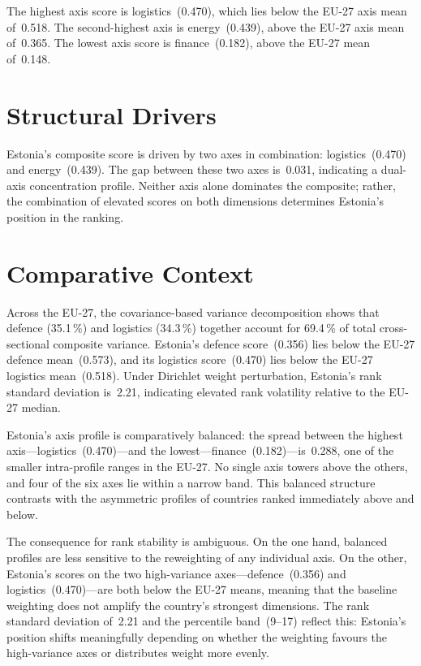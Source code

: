 \documentclass[12pt,a4paper]{article}
\begin{document}
The highest axis score is logistics~(0.470), which lies below the EU-27 axis mean of~0.518.  The second-highest axis is energy~(0.439), above the EU-27 axis mean of~0.365.  The lowest axis score is finance~(0.182), above the EU-27 mean of~0.148.


\section{Structural Drivers}
\label{sec:drivers}

\begin{sloppypar}
Estonia's composite score is driven by two axes in combination: logistics~(0.470) and energy~(0.439).  The gap between these two axes is~0.031, indicating a dual-axis concentration profile.  Neither axis alone dominates the composite; rather, the combination of elevated scores on both dimensions determines Estonia's position in the ranking.
\end{sloppypar}


\section{Comparative Context}
\label{sec:comparative}

Across the EU-27, the covariance-based variance decomposition shows that defence (35.1\,\%) and logistics (34.3\,\%) together account for 69.4\,\% of total cross-sectional composite variance.  Estonia's defence score~(0.356) lies below the EU-27 defence mean~(0.573), and its logistics score~(0.470) lies below the EU-27 logistics mean~(0.518).  Under Dirichlet weight perturbation, Estonia's rank standard deviation is~2.21, indicating elevated rank volatility relative to the EU-27 median.



\begin{sloppypar}
Estonia's axis profile is comparatively balanced: the spread between the highest axis---logistics~(0.470)---and the lowest---finance~(0.182)---is~0.288, one of the smaller intra-profile ranges in the EU-27.  No single axis towers above the others, and four of the six axes lie within a narrow band.  This balanced structure contrasts with the asymmetric profiles of countries ranked immediately above and below.
\end{sloppypar}

The consequence for rank stability is ambiguous.  On the one hand, balanced profiles are less sensitive to the reweighting of any individual axis.  On the other, Estonia's scores on the two high-variance axes---defence~(0.356) and logistics~(0.470)---are both below the EU-27 means, meaning that the baseline weighting does not amplify the country's strongest dimensions.  The rank standard deviation of~2.21 and the percentile band~(9--17) reflect this: Estonia's position shifts meaningfully depending on whether the weighting favours the high-variance axes or distributes weight more evenly.
\end{document}

